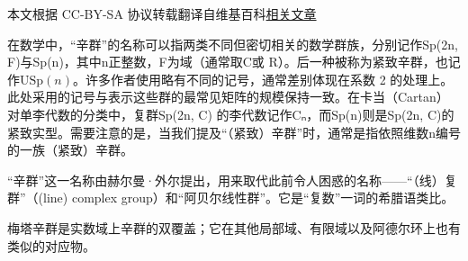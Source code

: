 
本文根据 CC-BY-SA 协议转载翻译自维基百科\href{https://en.wikipedia.org/wiki/Symplectic_group}{相关文章}

在数学中，“辛群”的名称可以指两类不同但密切相关的数学群族，分别记作Sp(2n, F)与Sp(n)，其中n正整数，F为域（通常取C或 R）。后一种被称为紧致辛群，也记作$\mathrm{USp}(n)$。许多作者使用略有不同的记号，通常差别体现在系数 2 的处理上。此处采用的记号与表示这些群的最常见矩阵的规模保持一致。在卡当（Cartan）对单李代数的分类中，复群Sp(2n, C) 的李代数记作Cₙ，而Sp(n)则是Sp(2n, C)的紧致实型。需要注意的是，当我们提及“（紧致）辛群”时，通常是指依照维数n编号的一族（紧致）辛群。

“辛群”这一名称由赫尔曼·外尔提出，用来取代此前令人困惑的名称——“（线）复群”（(line) complex group）和“阿贝尔线性群”。它是“复数”一词的希腊语类比。

梅塔辛群是实数域上辛群的双覆盖；它在其他局部域、有限域以及阿德尔环上也有类似的对应物。

